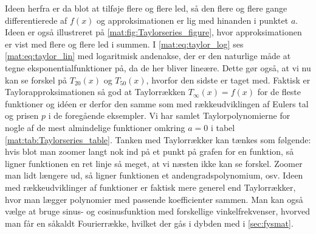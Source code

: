 %
%
Ideen herfra er da blot at tilføje flere og flere led, så den flere og flere gange differentierede af $f(x)$ og approksimationen er lig med hinanden i punktet $a$. Ideen er også illustreret på \cref{mat:fig:Taylorseries_figure}, hvor approksimationen er vist med flere og flere led i summen.  I \cref{mat:eq:taylor_log} ses \cref{mat:eq:taylor_lin} med logaritmisk andenakse, der er den naturlige måde at tegne eksponentialfunktioner på, da de her bliver lineære. Dette gør også, at vi nu kan se forskel på $T_{20}(x)$ og $T_{50}(x)$, hvorfor den sidste er taget med. Faktisk er Taylorapproksimationen så god at Taylorrækken $T_\infty(x) = f(x)$ for de fleste funktioner og idéen er derfor den samme som med rækkeudviklingen af Eulers tal og prisen $p$ i de foregående eksempler. Vi har samlet Taylorpolynomierne for nogle af de mest almindelige funktioner omkring $a = 0$ i tabel \ref{mat:tab:Taylorseries_table}. Tanken med Taylorrækker kan tænkes som følgende: hvis blot man zoomer langt nok ind på et punkt på grafen for en funktion, så ligner funktionen en ret linje så meget, at vi næsten ikke kan se forskel. Zoomer man lidt længere ud, så ligner funktionen et andengradspolynomium, osv. Ideen med rækkeudviklinger af funktioner er faktisk mere generel end Taylorrækker, hvor man lægger polynomier med passende koefficienter sammen. Man kan også vælge at bruge sinus- og cosinusfunktion med forskellige vinkelfrekvenser, hvorved man får en såkaldt Fourierrække, hvilket der gås i dybden med i \cref{sec:fysmat}.

